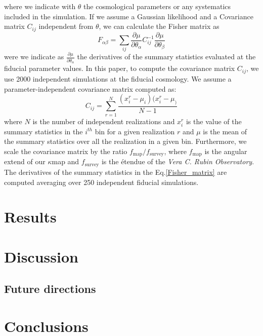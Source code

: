 \documentclass[twocolumn,twocolappendix]{aastex63}
\begin{document}
where we indicate with $\theta$ the cosmological parameters or any systematics included in the simulation.
If we assume a Gaussian likelihood and a Covariance matrix $C_{ij}$ independent from $\theta$, we can calculate the Fisher matrix as
\begin{equation}\label{Fisher_matrix}
      F_{\alpha \beta}= \sum_{ij}\frac{\partial \mu}{\partial \theta_{\alpha}} C_{ij}^{-1}
      \frac{\partial \mu}{\partial \theta_{\beta}}
\end{equation}
were we indicate as $ \frac{\partial \mu}{\partial \theta_{\alpha}} $ the derivatives of the summary statistics evaluated at the fiducial parameter values.
In this paper, to compute the covariance matrix $C_{ij}$, we use 2000 independent simulations at the fiducial cosmology. 
We assume a parameter-independent covariance matrix computed as:
\begin{equation}
    C_{ij}=\sum_{r=1}^N
    \frac{(x_i^r-\mu_i)(x_i^r-\mu_)}{N-1}
\end{equation}
where $N$ is the number of independent realizations and $x_i^r$ is the value of the summary statistics in the $i^{th}$ bin for a given realization $r$ and $\mu$ is the mean of the summary statistics over all the realization in a given bin. 
Furthermore, we scale the covariance matrix by the ratio $f_{\text{map}}/f_{\text{survey}}$, where $f_{\text{map}}$ is the angular extend of our $\kappa$map and $f_{\text{survey}}$ is the étendue of the \textit{Vera C. Rubin Observatory}.
The derivatives of the summary statistics in the Eq.\ref{Fisher_matrix} are computed averaging over 250 independent fiducial simulations.


\section{Results}

\section{Discussion}

\subsection{Future directions}

\section{Conclusions}






\end{document}

